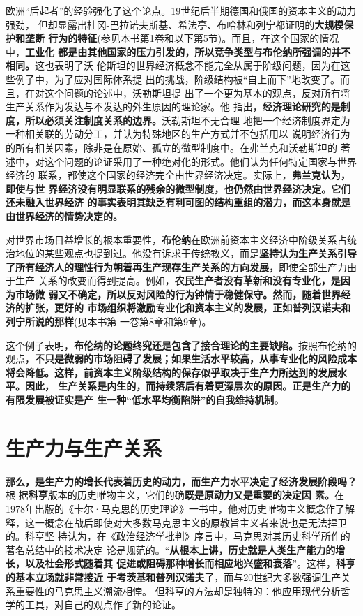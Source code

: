 欧洲“后起者”的经验强化了这个论点。19世纪后半期德国和俄国的资本主义的动力强劲，
但却显露出杜冈-巴拉诺夫斯基、希法亭、布哈林和列宁都证明的\textbf{大规模保护和垄断
  行为的特征}(参见本书第1卷和以下第5节)。而且，在这个国家的情况中，\textbf{工业化
  都是由其他国家的压力引发的，所以竞争类型与布伦纳所强调的并不相同。}这也表明了沃
伦斯坦的世界经济概念不能完全从属于阶级问题，因为在这些例子中，为了应对国际体系提
出的挑战，阶级结构被“自上而下”地改变了。而且，在对这个问题的论述中，沃勒斯坦提
出了一个更为基本的观点，反对所有将生产关系作为发达与不发达的外生原因的理论家。他
指出，\textbf{经济理论研究的是制度，所以必须关注制度关系的边界。}沃勒斯坦不无合理
地把一个经济制度界定为一种相关联的劳动分工，并认为特殊地区的生产方式并不包括用以
说明经济行为的所有相关因素，除非是在原始、孤立的微型制度中。在弗兰克和沃勒斯坦的
著述中，对这个问题的论证采用了一种绝对化的形式。他们认为任何特定国家与世界经济的
联系，都使这个国家的经济完全由世界经济决定。实际上，\textbf{弗兰克认为，即使与世
  界经济没有明显联系的残余的微型制度，也仍然由世界经济决定。它们还未融入世界经济
  的事实表明其缺乏有利可图的结构重组的潜力，而这本身就是由世界经济的情势决定的。}

对世界市场日益增长的根本重要性，\textbf{布伦纳}在欧洲前资本主义经济中阶级关系占统
治地位的某些观点也提到过。他没有诉求于传统教义，而是\textbf{坚持认为生产关系引导
  了所有经济人的理性行为朝着再生产现存生产关系的方向发展，}即使全部生产力由于生产
关系的改变而得到提高。例如，\textbf{农民生产者没有革新和没有专业化，是因为市场微
  弱又不确定，所以反对风险的行为钟情于稳健保守。然而，随着世界经济的扩张，更好的
  市场组织将激励专业化和资本主义的发展，正如普列汉诺夫和列宁所说的那样}(见本书第
一卷第8章和第9章)。

这个例子表明，\textbf{布伦纳的论题终究还是包含了接合理论的主要缺陷。}按照布伦纳的
观点，\textbf{不只是微弱的市场阻碍了发展；如果生活水平较高，从事专业化的风险成本
  将会降低。这样，前资本主义阶级结构的保存似乎取决于生产力所达到的发展水平。因此，
  生产关系是内生的，而持续落后有着更深层次的原因。正是生产力的有限发展被证实是产
  生一种“低水平均衡陷阱”的自我维持机制。}

\section{生产力与生产关系}

\textbf{那么，是生产力的增长代表着历史的动力，而生产力水平决定了经济发展阶段吗？}根
据\textbf{科亨}版本的历史唯物主义，它们的确\textbf{既是原动力又是重要的决定因
  素。}在1978年出版的《卡尔·马克思的历史理论》一书中，他对历史唯物主义概念作了解
释，这一概念在战后即使对大多数马克思主义的原教旨主义者来说也是无法捍卫的。科亨坚
持认为，在《政治经济学批判》序言中，马克思对其历史科学所作的著名总结中的技术决定
论是规范的。“\textbf{从根本上讲，历史就是人类生产能力的增长，以及社会形式随着其
  促进或阻碍那种增长而相应地兴盛和衰落}”。这样，\textbf{科亨的基本立场就非常接近
  于考茨基和普列汉诺夫}了，而与20世纪大多数强调生产关系重要性的马克思主义潮流相悖。
但科亨的方法却是独特的：他应用现代分析哲学的工具，对自己的观点作了新的论证。


